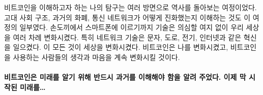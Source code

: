 \begin{comment}
	My quest of trying to make sense of Bitcoin has led me down the pathways
	of history in more ways than one. Understanding ancient societal
	structures, past monies, and how communication networks evolved were all
	part of the journey. From the handaxe to the smartphone, technology has
	undoubtedly changed our world many times over. Networked technologies
	are especially transformational: writing, roads, electricity, the
	internet. All of them changed the world. Bitcoin has changed mine and
	will continue to change the minds and hearts of those who dare to use
	it.
\end{comment}
비트코인을 이해하고자 하는 나의 탐구는 여러 방면으로 역사를 돌아보는 여정이었다.
고대 사회 구조, 과거의 화폐, 통신 네트워크가 어떻게 진화했는지 이해하는 것도 이 여정의 일부였다.
손도끼에서 스마트폰에 이르기까지 기술은 의심할 여지 없이 우리 세상을 여러 차례 변화시켰다.
특히 네트워크 기술은 문자, 도로, 전기, 인터넷과 같은 혁신을 일으켰다.
이 모든 것이 세상을 변화시켰다. 
비트코인은 나를 변화시켰고, 비트코인을 사용하는 사람들의 생각과 마음을 계속 변화시킬 것이다.

\paragraph{비트코인은 미래를 알기 위해 반드시 과거를 이해해야 함을 알려 주었다. 이제 막 시작된 미래를\ldots}

